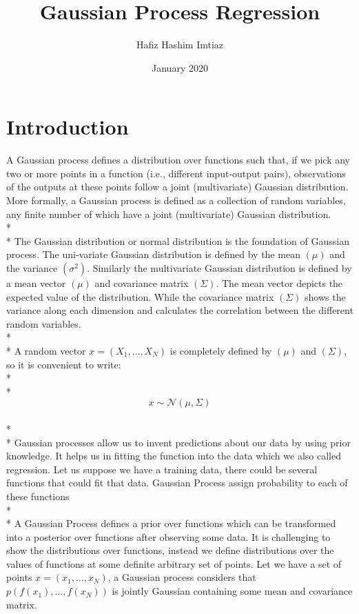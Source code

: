 \documentclass{article}
\title{Gaussian Process Regression}
\author{Hafiz Hashim Imtiaz }
\date{January 2020}
\begin{document}
\maketitle

\section{Introduction}
A Gaussian process defines a distribution over functions such that, if we pick any two or more points in a function (i.e., different input-output pairs), observations of the outputs at these points follow a joint (multivariate)
Gaussian distribution. More formally, a Gaussian process is defined as a collection of random variables, any finite number of which have a joint (multivariate) Gaussian distribution. 
\\*
\\*
The Gaussian distribution or normal distribution is the foundation of Gaussian process. The uni-variate Gaussian distribution is defined by the mean $(\mu)$ and the variance $(\sigma^2)$. Similarly the multivariate Gaussian distribution is defined by a mean vector
$(\mu)$ and covariance matrix $(\Sigma)$. The mean vector depicts the expected value of the distribution. While the covariance matrix $(\Sigma)$ shows the variance along each dimension and calculates the correlation between the different random variables. 
\\*
\\*
A random vector $x = (X_1,\dots,X_N)$ is completely defined by $(\mu)$ and $(\Sigma)$, so it is convenient to write:
\\*
\\*
$$x \sim \mathcal{N}{\left(\mu, \Sigma\right)}$$
\\*
\\*
Gaussian processes allow us to invent predictions about our data by using prior knowledge. It helps us in fitting the function into the data which we also called regression. Let us suppose we have a training data, there could be several functions that could fit that data. Gaussian Process assign probability to each of these functions
\\*
\\*
A Gaussian Process defines a prior over functions which can be transformed into a posterior over functions after observing some data. It is challenging to show the distributions over functions, instead we define distributions over the values of functions at some definite arbitrary set of points. Let we have a set of points $x = (x_1,\dots,x_N)$, a Gaussian process considers that $p(f(x_1),\dots,f(x_N))$ is jointly Gaussian containing some mean and covariance matrix. 
\end{document}
